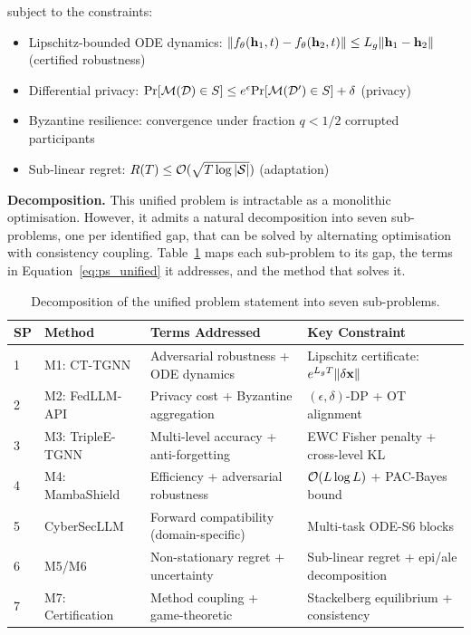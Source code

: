 \noindent subject to the constraints:
\begin{itemize}
\item Lipschitz-bounded ODE dynamics: $\|f_\theta(\mathbf{h}_1,t)-f_\theta(\mathbf{h}_2,t)\|\le L_g\|\mathbf{h}_1-\mathbf{h}_2\|$ (certified robustness)
\item Differential privacy: $\mathrm{Pr}[\mathcal{M}(\mathcal{D})\in S]\le e^{\epsilon}\mathrm{Pr}[\mathcal{M}(\mathcal{D}')\in S]+\delta$ (privacy)
\item Byzantine resilience: convergence under fraction $q<1/2$ corrupted participants
\item Sub-linear regret: $R(T)\le\mathcal{O}(\sqrt{T\log|\mathcal{S}|})$ (adaptation)
\end{itemize}

\noindent\textbf{Decomposition.} This unified problem is intractable as a monolithic optimisation. However, it admits a natural decomposition into seven sub-problems, one per identified gap, that can be solved by alternating optimisation with consistency coupling. Table~\ref{tab:decomposition} maps each sub-problem to its gap, the terms in Equation~\eqref{eq:ps_unified} it addresses, and the method that solves it.

\begin{table}[htbp]\centering\small
\caption{Decomposition of the unified problem statement into seven sub-problems.}
\label{tab:decomposition}
\small
\renewcommand{\arraystretch}{0.92}\begin{tabular}{p{0.5cm} p{3.0cm} p{4.5cm} p{5.0cm}}
\toprule
\textbf{SP} & \textbf{Method} & \textbf{Terms Addressed} & \textbf{Key Constraint} \\
\midrule
1 & M1: CT-TGNN & Adversarial robustness + ODE dynamics & Lipschitz certificate: $e^{L_gT}\|\delta\mathbf{x}\|$ \\
2 & M2: FedLLM-API & Privacy cost + Byzantine aggregation & $(\epsilon,\delta)$-DP + OT alignment \\
3 & M3: TripleE-TGNN & Multi-level accuracy + anti-forgetting & EWC Fisher penalty + cross-level KL \\
4 & M4: MambaShield & Efficiency + adversarial robustness & $\mathcal{O}(L\log L)$ + PAC-Bayes bound \\
5 & CyberSecLLM & Forward compatibility (domain-specific) & Multi-task ODE-S6 blocks \\
6 & M5/M6 & Non-stationary regret + uncertainty & Sub-linear regret + epi/ale decomposition \\
7 & M7: Certification & Method coupling + game-theoretic & Stackelberg equilibrium + consistency \\
\bottomrule
\end{tabular}
\end{table}

